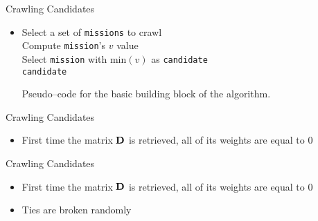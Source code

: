 \begin{frame}{Crawling Candidates}
    \begin{itemize}
        \item[\xspace]
        \begin{algorithm}[H]
            \SetAlgoLined
                \FMain{} {
                     {
                        Select a set of \texttt{missions} to crawl \\
                         {
                            Compute \texttt{mission}'s $v$ value \\
                        }
                        Select \texttt{mission} with $\text{min}(v)$ as \texttt{candidate} \\
                        \Return \texttt{candidate}
                    }
                }
            \caption{Pseudo--code for the basic building block \newline of the \mlblink algorithm.}
            \label{pscode:ml-blink}
        \end{algorithm}
    \end{itemize}
\end{frame}

\begin{frame}{Crawling Candidates}
    \begin{itemize}
        \item First time the matrix $\boldsymbol{\mathbf{D}}$ is retrieved, all of its weights are equal to $0$
    \end{itemize}
\end{frame}

\begin{frame}{Crawling Candidates}
    \begin{itemize}
        \item First time the matrix $\boldsymbol{\mathbf{D}}$ is retrieved, all of its weights are equal to $0$
        \item Ties are broken randomly
    \end{itemize}
\end{frame}
